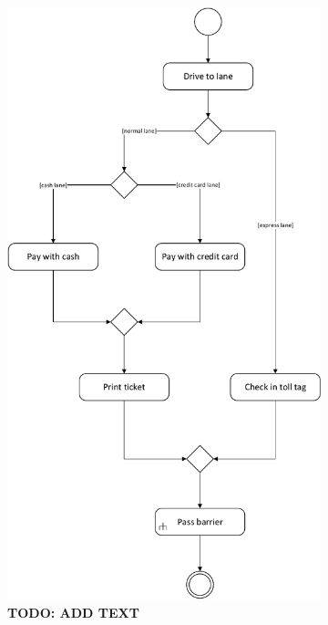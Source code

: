 \begin{figure} 
	\centering
	\begin{subfigure}[b]{0.6\textwidth}
	\includegraphics[width=\textwidth]{img/activity_diagrams/check_in}
	\caption{\textbf{TODO: ADD TEXT}}
	\end{subfigure}
	~
	\begin{subfigure}[b]{0.3\textwidth}

\end{subfigure}
\end{figure}
